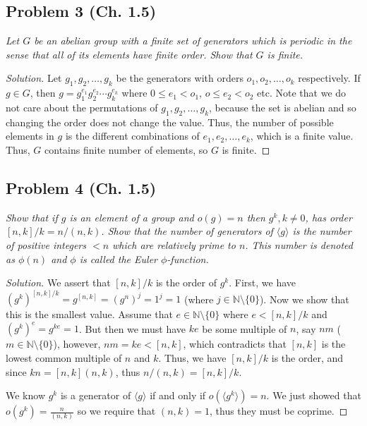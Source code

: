 \documentclass{article}
\newcommand{\N}{{\mathbb N}}
\begin{document}
\subsection*{Problem 3 (Ch. 1.5)}
{\it Let $G$ be an abelian group with a finite set of generators which is
\emph{periodic} in the sense that all of its elements have finite order.
Show that $G$ is finite.}

\begin{proof}[Solution]\let\qed\relax
	Let $g_1,g_2,\dots,g_k$ be the generators
	with orders $o_1,o_2,\dots,o_k$ respectively.
	If $g \in G$, then $g = g_1^{e_1}g_2^{e_2}\cdots g_k^{e_k}$
	where $0 \leq e_1 < o_1$, $o \leq e_2 < o_2$ etc.
	Note that we do not care about the permutations of $g_1,g_2,\dots,g_k$,
	because the set is abelian and so changing the order does not change the value.
	Thus, the number of possible elements in $g$ is the different
	combinations of $e_1,e_2,\dots,e_k$, which is a finite value.
	Thus, $G$ contains finite number of elements, so $G$ is finite.
\end{proof}

\subsection*{Problem 4 (Ch. 1.5)}
{\it Show that if $g$ is an element of a group and $o(g) = n$
then $g^k,k\neq0$, has order $[n,k]/k = n/(n,k)$.
Show that the number of generators of $\langle g \rangle$ is the number
of positive integers $<n$ which are relatively prime to $n$.
This number is denoted as $\phi(n)$ and $\phi$ is called the \emph{Euler $\phi$-function}.}

\begin{proof}[Solution]\let\qed\relax
	We assert that $[n,k]/k$ is the order of $g^k$.
	First, we have $(g^k)^{[n,k]/k} = g^{[n,k]} = (g^n)^j = 1^j = 1$
	(where $j \in \N\setminus\{0\}$).
	Now we show that this is the smallest value.
	Assume that $e \in\N\setminus\{0\}$ where $e < [n,k]/k$
	and $(g^k)^e = g^{ke} = 1$.
	But then we must have $ke$ be some multiple of $n$, say $nm$ ($m\in\N\setminus\{0\}$),
	however, $nm = ke < [n,k]$,
	which contradicts that $[n,k]$ is the lowest common multiple of $n$ and $k$.
	Thus, we have $[n,k]/k$ is the order,
	and since $kn = [n,k](n,k)$, thus $n/(n,k) = [n,k]/k$.

	We know $g^k$ is a generator of $\langle g \rangle$ if and only if $o(\langle g^k \rangle) = n$.
	We just showed that $o(g^k) = \frac{n}{(n,k)}$ so we require that $(n,k) = 1$,
	thus they must be coprime.
\end{proof}
\end{document}
